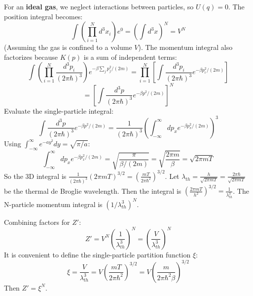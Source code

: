\documentclass[11pt]{article}
\begin{document}
For an \textbf{ideal gas}, we neglect interactions between particles, so $U(q)=0$.
The position integral becomes:
\[ \int \left( \prod_{i=1}^N d^3 x_i \right) e^0 = \left( \int d^3 x \right)^N = V^N \]
(Assuming the gas is confined to a volume $V$).
The momentum integral also factorizes because $K(p)$ is a sum of independent terms:
\[ \int \left( \prod_{i=1}^N \frac{d^3 p_i}{(2\pi\hbar)^3} \right) e^{-\beta \sum_j p_j^2/(2m)} = \prod_{i=1}^N \left[ \int \frac{d^3 p_i}{(2\pi\hbar)^3} e^{-\beta p_i^2/(2m)} \right] \]
\[ = \left[ \int \frac{d^3 p}{(2\pi\hbar)^3} e^{-\beta p^2/(2m)} \right]^N \]
Evaluate the single-particle integral:
\[ \int \frac{d^3 p}{(2\pi\hbar)^3} e^{-\beta p^2/(2m)} = \frac{1}{(2\pi\hbar)^3} \left( \int_{-\infty}^{\infty} dp_x e^{-\beta p_x^2/(2m)} \right)^3 \]
Using $\int_{-\infty}^{\infty} e^{-ay^2} dy = \sqrt{\pi/a}$:
\[ \int_{-\infty}^{\infty} dp_x e^{-\beta p_x^2/(2m)} = \sqrt{\frac{\pi}{\beta/(2m)}} = \sqrt{\frac{2\pi m}{\beta}} = \sqrt{2\pi m T} \]
So the 3D integral is $\frac{1}{(2\pi\hbar)^3} (2\pi m T)^{3/2} = \left( \frac{m T}{2\pi\hbar^2} \right)^{3/2}$.
Let $\lambda_{th} = \frac{h}{\sqrt{2\pi m T}} = \frac{2\pi\hbar}{\sqrt{2\pi m T}}$ be the thermal de Broglie wavelength.
Then the integral is $\left( \frac{2\pi m T}{h^2} \right)^{3/2} = \frac{1}{\lambda_{th}^3}$.
The N-particle momentum integral is $(1/\lambda_{th}^3)^N$.

Combining factors for $Z'$:
\[ Z' = V^N \left( \frac{1}{\lambda_{th}^3} \right)^N = \left( \frac{V}{\lambda_{th}^3} \right)^N \]
It is convenient to define the single-particle partition function $\xi$:
\[ \xi = \frac{V}{\lambda_{th}^3} = V \left( \frac{m T}{2\pi\hbar^2} \right)^{3/2} = V \left( \frac{m}{2\pi\hbar^2\beta} \right)^{3/2} \]
Then $Z' = \xi^N$.
\end{document}

